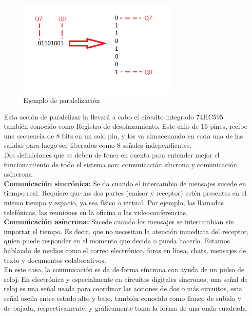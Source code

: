 \documentclass{article}
\begin{document}
\begin{figure}[!ht]
\includegraphics[width=8cm]{paralelizacion.png}
\centering
\caption{Ejemplo de paralelización}
\end{figure}

Esta acción de paralelizar la llevará a cabo el circuito integrado 74HC595 también conocido como Registro de desplazamiento. Este chip de 16 pines, recibe una secuencia de 8 bits en un solo pin, y los va almacenando en cada una de las salidas para luego ser liberados como 8 señales independientes.\\

Dos definiciones que se deben de tener en cuenta para entender mejor el funcionamiento de todo el sistema son: comunicación síncrona y comunicación asíncrona.\\

\noindent\textbf{Comunicación sincrónica:} Se da cuando el intercambio de mensajes sucede en tiempo real. Requiere que las dos partes (emisor y receptor) estén presentes en el mismo tiempo y espacio, ya sea físico o virtual. Por ejemplo, las llamadas telefónicas, las reuniones en la oficina o las videoconferencias.\\

\noindent\textbf{Comunicación asíncrona:} Sucede cuando los mensajes se intercambian sin importar el tiempo. Es decir, que no necesitan la atención inmediata del receptor, quien puede responder en el momento que decida o pueda hacerlo. Estamos hablando de medios como el correo electrónico, foros en línea, chats, mensajes de texto y documentos colaborativos.\cite{sincrosite}\\

En este caso, la comunicación se da de forma síncrona con ayuda de un pulso de reloj.
En electrónica y especialmente en circuitos digitales síncronos, una señal de reloj es una señal usada para coordinar las acciones de dos o más circuitos, esta señal oscila entre estado alto y bajo, también conocido como flanco de subida y de bajada, respectivamente, y gráficamente toma la forma de una onda cuadrada.\cite{relojsite}\\
\end{document}

